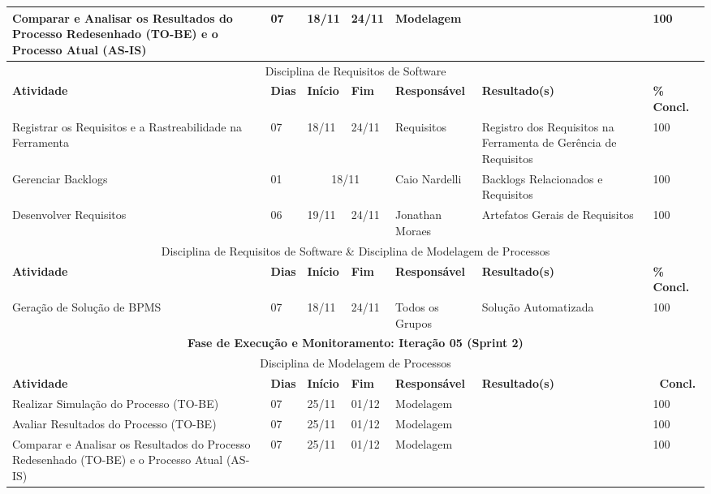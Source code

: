 \begin{center}
	\begin{tabular}{|m{6cm}|m{1cm}|m{1cm}|m{1cm}|m{4cm}|m{6cm}|m{2cm}|}
	\hline
	Comparar e Analisar os Resultados do Processo Redesenhado (TO-BE) e o Processo Atual (AS-IS) & 07 & 18/11 & 24/11 & Modelagem & & 100 \\ \hline
	\multicolumn{7}{|c|}{Disciplina de Requisitos de Software} \\
	\hline
	\textbf{Atividade} & \textbf{Dias} & \textbf{Início} & \textbf{Fim} & \textbf{Responsável} & \textbf{Resultado(s)} & \textbf{\% Concl.} \\ \hline
	Registrar os Requisitos e a Rastreabilidade na Ferramenta & 07 & 18/11 & 24/11 & Requisitos & Registro dos Requisitos na Ferramenta de Gerência de Requisitos & 100 \\ \hline
	Gerenciar Backlogs & 01 & \multicolumn{2}{c|}{18/11} & Caio Nardelli & Backlogs Relacionados e Requisitos & 100 \\ \hline
	Desenvolver Requisitos & 06 & 19/11 & 24/11 & Jonathan Moraes & Artefatos Gerais de Requisitos & 100 \\ \hline
	\multicolumn{7}{|c|}{Disciplina de Requisitos de Software \& Disciplina de Modelagem de Processos} \\ \hline
	\textbf{Atividade} & \textbf{Dias} & \textbf{Início} & \textbf{Fim} & \textbf{Responsável} & \textbf{Resultado(s)} & \textbf{\% Concl.} \\ \hline
	Geração de Solução de BPMS & 07 & 18/11 & 24/11 & Todos os Grupos & Solução Automatizada & 100 \\ \hline
	\multicolumn{7}{|c|}{\textbf{Fase de Execução e Monitoramento: Iteração 05 (Sprint 2)}} \\
	\hline
	\multicolumn{7}{|c|}{Disciplina de Modelagem de Processos} \\
	\hline
	\textbf{Atividade} & \textbf{Dias} & \textbf{Início} & \textbf{Fim} & \textbf{Responsável} & \textbf{Resultado(s)} & \textbf{\ Concl.} \\ \hline
	Realizar Simulação do Processo (TO-BE) & 07 & 25/11 & 01/12 & Modelagem & & 100 \\ \hline
	Avaliar Resultados do Processo (TO-BE) & 07 & 25/11 & 01/12 & Modelagem & & 100 \\ \hline
	Comparar e Analisar os Resultados do Processo Redesenhado (TO-BE) e o Processo Atual (AS-IS) & 07 & 25/11 & 01/12 & Modelagem & & 100 \\ \hline
	\end{tabular}
\end{center}
